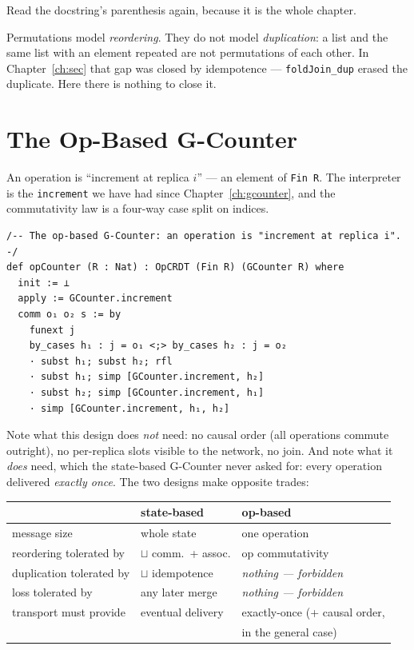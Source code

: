 \documentclass[12pt, a4paper, openright]{book}
\theoremstyle{thmstyle}
\theoremstyle{defstyle}
\newcommand{\lc}[1]{\texttt{#1}}
\begin{document}
Read the docstring's parenthesis again, because it is the whole chapter.

Permutations model \emph{reordering}. They do not model
\emph{duplication}: a list and the same list with an element repeated
are not permutations of each other. In Chapter~\ref{ch:sec} that gap was
closed by idempotence --- \lc{foldJoin_dup} erased the duplicate. Here
there is nothing to close it.

\section{The Op-Based G-Counter}

An operation is ``increment at replica $i$'' --- an element of
\lc{Fin R}. The interpreter is the \lc{increment} we have had since
Chapter~\ref{ch:gcounter}, and the commutativity law is a four-way case
split on indices.

\begin{verbatim}
/-- The op-based G-Counter: an operation is "increment at replica i". -/
def opCounter (R : Nat) : OpCRDT (Fin R) (GCounter R) where
  init := ⊥
  apply := GCounter.increment
  comm o₁ o₂ s := by
    funext j
    by_cases h₁ : j = o₁ <;> by_cases h₂ : j = o₂
    · subst h₁; subst h₂; rfl
    · subst h₁; simp [GCounter.increment, h₂]
    · subst h₂; simp [GCounter.increment, h₁]
    · simp [GCounter.increment, h₁, h₂]
\end{verbatim}

Note what this design does \emph{not} need: no causal order (all
operations commute outright), no per-replica slots visible to the
network, no join. And note what it \emph{does} need, which the
state-based G-Counter never asked for: every operation delivered
\emph{exactly once}. The two designs make opposite trades:

\begin{center}
\begin{tabular}{lll}
\toprule
 & state-based & op-based \\
\midrule
message size & whole state & one operation \\
reordering tolerated by & $\sqcup$ comm.\ + assoc. & op commutativity \\
duplication tolerated by & $\sqcup$ idempotence & \emph{nothing --- forbidden} \\
loss tolerated by & any later merge & \emph{nothing --- forbidden} \\
transport must provide & eventual delivery & exactly-once (+ causal order,\\
 & & \quad in the general case) \\
\bottomrule
\end{tabular}
\end{center}
\end{document}
